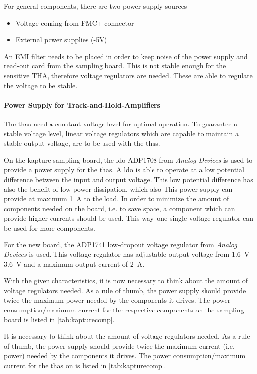 For general components, there are two power supply sources
\begin{itemize}
\item Voltage coming from FMC+ connector
\item External power supplies (-5V)
\end{itemize}
An EMI filter needs to be placed in order to keep noise of the power supply and read-out card from the sampling board.
This is not stable enough for the sensitive THA, therefore voltage regulators are needed.
These are able to regulate the voltage to be stable.


\paragraph{Power Supply for Track-and-Hold-Amplifiers}
The \glspl{tha} need a constant voltage level for optimal operation. To guarantee a stable voltage level, linear voltage regulators which are capable to maintain a stable output voltage, are to be used with the \glspl{tha}.

On the \gls{kapture} sampling board, the \gls{ldo} ADP1708 from \textit{Analog Devices} is used to provide a power supply for the \glspl{tha}. A \gls{ldo} is able to operate at a low potential difference between the input and output voltage. This low potential difference has also the benefit of low power dissipation, which also    
This power supply can provide at maximum \SI{1}{\ampere} to the load. 
In order to minimize the amount of components needed on the board, i.e. to save space, a component which can provide higher currents should be used. 
This way, one single voltage regulator can be used for more components.

For the new board, the ADP1741 low-dropout voltage regulator from \textit{Analog Devices} is used. This voltage regulator has adjustable output voltage from \SIrange{1.6}{3.6}{\volt} and a maximum output current of \SI{2}{\ampere}. 

With the given characteristics, it is now necessary to think about the amount of voltage regulators needed.
As a rule of thumb, the power supply should provide twice the maximum power needed by the components it drives. \cite{michele}
The power consumption/maximum current for the respective components on the sampling board is listed in \autoref{tab:kapturecomp}. 

It is necessary to think about the amount of voltage regulators needed. As a rule of thumb, the power supply should provide twice the maximum current (i.e. power) needed by the components it drives. \cite{michele} The power consumption/maximum current for the \glspl{tha} on is listed in \autoref{tab:kapturecomp}. 

